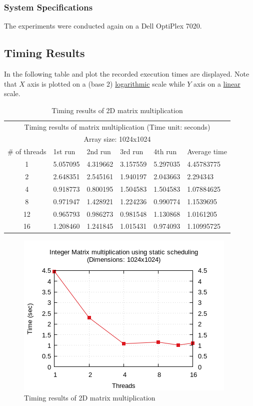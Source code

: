 \documentclass{article}
\begin{document}
\subsubsection{System Specifications}
The experiments were conducted again on a Dell OptiPlex 7020.


\subsection{Timing Results}
In the following table and plot the recorded execution times are displayed.
Note that $X$ axis is plotted on a (base 2) \underline{logarithmic} scale while
$Y$ axis on a \underline{linear} scale.


\begin{table}[htbp]
  \centering
    \begin{tabular}{|c||l|l|l|l||l|} 
    \hline
    \multicolumn{6}{|c|}{Timing results of matrix multiplication (Time unit: seconds)} \\
    \multicolumn{6}{|c|}{Array size: 1024x1024} \\
    \hline
   \# of threads & 1st run & 2nd run & 3rd run & 4th run & Average time\\ [0.5ex] 
    \hline\hline
    1 & 5.057095 & 4.319662 & 3.157559 & 5.297035 & 4.45783775 \\ 
    \hline
    2 & 2.648351 & 2.545161 & 1.940197 & 2.043663 & 2.294343 \\
    \hline
    4 & 0.918773 & 0.800195 & 1.504583 & 1.504583 & 1.07884625 \\
    \hline
    8 & 0.971947 & 1.428921 & 1.224236 & 0.990774 & 1.1539695 \\
    \hline
    12 & 0.965793 & 0.986273 & 0.981548 & 1.130868 & 1.0161205 \\
    \hline
    16 & 1.208460 & 1.241845 & 1.015431 & 0.974093 & 1.10995725 \\ [1ex]
    \hline
    \end{tabular}
  \caption{Timing results of 2D matrix multiplication}
\end{table}


\begin{figure}[htbp]
  \centering
  \includegraphics[width=0.55\columnwidth]{../../hw1/ex2/plots/matmul.png}
  \caption{Timing results of 2D matrix multiplication}
\end{figure}
\end{document}
